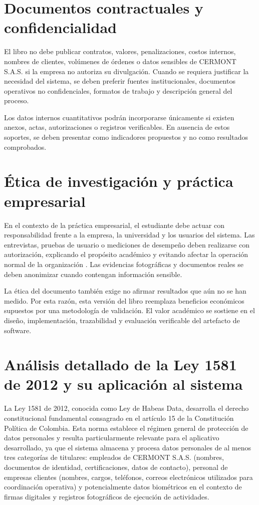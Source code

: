 \section{Documentos contractuales y confidencialidad}

El libro no debe publicar contratos, valores, penalizaciones, costos internos, nombres de clientes, volúmenes de órdenes o datos sensibles de CERMONT S.A.S. si la empresa no autoriza su divulgación. Cuando se requiera justificar la necesidad del sistema, se deben preferir fuentes institucionales, documentos operativos no confidenciales, formatos de trabajo y descripción general del proceso.

Los datos internos cuantitativos podrán incorporarse únicamente si existen anexos, actas, autorizaciones o registros verificables. En ausencia de estos soportes, se deben presentar como indicadores propuestos y no como resultados comprobados.

\section{Ética de investigación y práctica empresarial}

En el contexto de la práctica empresarial, el estudiante debe actuar con responsabilidad frente a la empresa, la universidad y los usuarios del sistema. Las entrevistas, pruebas de usuario o mediciones de desempeño deben realizarse con autorización, explicando el propósito académico y evitando afectar la operación normal de la organización \cite{ministerio1993}. Las evidencias fotográficas y documentos reales se deben anonimizar cuando contengan información sensible.

La ética del documento también exige no afirmar resultados que aún no se han medido. Por esta razón, esta versión del libro reemplaza beneficios económicos supuestos por una metodología de validación. El valor académico se sostiene en el diseño, implementación, trazabilidad y evaluación verificable del artefacto de software.

\section{Análisis detallado de la Ley 1581 de 2012 y su aplicación al sistema}
\label{sec:ley1581-detalle}

La Ley 1581 de 2012, conocida como Ley de Habeas Data, desarrolla el derecho constitucional fundamental consagrado en el artículo 15 de la Constitución Política de Colombia. Esta norma establece el régimen general de protección de datos personales y resulta particularmente relevante para el aplicativo desarrollado, ya que el sistema almacena y procesa datos personales de al menos tres categorías de titulares: empleados de CERMONT S.A.S. (nombres, documentos de identidad, certificaciones, datos de contacto), personal de empresas clientes (nombres, cargos, teléfonos, correos electrónicos utilizados para coordinación operativa) y potencialmente datos biométricos en el contexto de firmas digitales y registros fotográficos de ejecución de actividades.

